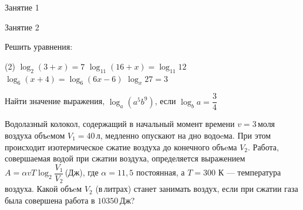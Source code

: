 %

\begin{class}[number=1]
	
	\begin{listofex}
		\item   Занятие 1
	\end{listofex}
\end{class}

\begin{class}[number=2]
	\begin{listofex}
		\item Занятие 2
	\end{listofex}
\end{class}

\begin{homework}[number=1]
	\begin{listofex}
		\item Решить уравнения:
		\begin{tasks}(2)
			\task \( \log_2(3+x)=7 \)
			\task \( \log_{11}(16+x)=\log_{11}12 \)
			\task \( \log_6(x+4)=\log_6(6x-6) \)
			\task \( \log_x27=3 \)
		\end{tasks}
		\item Найти значение выражения, \( \log_a(a^5b^9) \), \quad если \( \log_ba=\dfrac{3}{4} \)
		\item Водолазный колокол, содержащий в начальный момент времени \(  v =3 \) моля воздуха объeмом \( V_1=40 \) л, медленно опускают на дно водоeма. При этом происходит изотермическое сжатие воздуха до конечного объeма \( V_2 \). Работа, совершаемая водой при сжатии воздуха, определяется выражением \( A=\alpha vT\log_2\dfrac{V_1}{V_2} \) (Дж), где  \( \alpha=11,5  \) постоянная, а \( T = 300 \) К --- температура воздуха. Какой объeм \( V_2 \) (в литрах) станет занимать воздух, если при сжатии газа была совершена работа в \( 10350 \) Дж?
	\end{listofex}
\end{homework}

